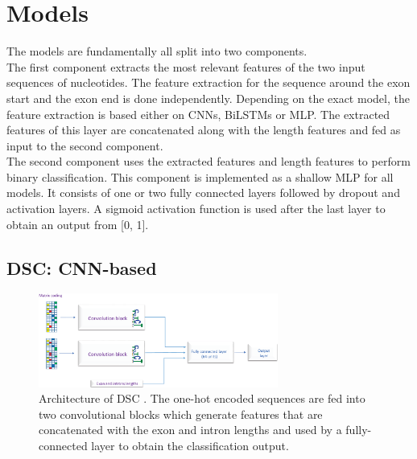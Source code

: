 \section{Models} \label{sec:models}
The models are fundamentally all split into two components. \\
The first component extracts the most relevant features of the two input sequences of nucleotides. The feature extraction for the sequence around the exon start and the exon end is done independently. Depending on the exact model, the feature extraction is based either on CNNs, BiLSTMs or MLP. The extracted features of this layer are concatenated along with the length features and fed as input to the second component.\\
The second component uses the extracted features and length features to perform binary classification. This component is implemented as a shallow MLP for all models. It consists of one or two fully connected layers followed by dropout and activation layers. A sigmoid activation function is used after the last layer to obtain an output from [0, 1].
\subsection{DSC: CNN-based} \label{subsec:dsc}

\begin{figure}
	\centering\includegraphics[width=0.7\textwidth]{../visualizations/ch4-methods/dsc_architecture.png} 
	\caption{
		Architecture of DSC \cite{dsc}. The one-hot encoded sequences are fed into two convolutional blocks which generate features that are concatenated with the exon and intron lengths and used by a fully-connected layer to obtain the classification output.
	}
	\label{fig:dsc_architecture}
\end{figure}

